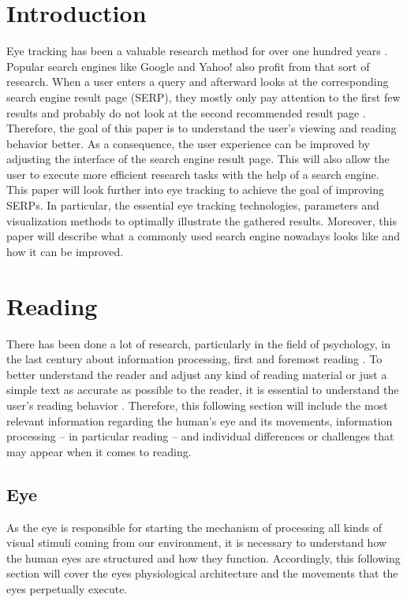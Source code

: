 \section{Introduction}
\label{section:Introduction}
Eye tracking has been a valuable research method for over one hundred years \autocite{biedert2010eyebook}. Popular search engines like Google and Yahoo! also profit from that sort of research. When a user enters a query and afterward looks at the corresponding search engine result page (SERP), they mostly only pay attention to the first few results and probably do not look at the second recommended result page \autocite{lorigo2008eye, liu2015influence}.\\
Therefore, the goal of this paper is to understand the user's viewing and reading behavior better. As a consequence, the user experience can be improved by adjusting the interface of the search engine result page. This will also allow the user to execute more efficient research tasks with the help of a search engine.\\
This paper will look further into eye tracking to achieve the goal of improving SERPs. In particular, the essential eye tracking technologies, parameters and visualization methods to optimally illustrate the gathered results. Moreover, this paper will describe what a commonly used search engine nowadays looks like and how it can be improved.


\section{Reading}
\label{section:Reading}
There has been done a lot of research, particularly in the field of psychology, in the last century about information processing, first and foremost reading \autocite{rayner1998eye, biedert2010eyebook}. 
To better understand the reader and adjust any kind of reading material or just a simple text as accurate as possible to the reader, it is essential to understand the user's reading behavior \autocite{biedert2010eyebook}. 
Therefore, this following section will include the most relevant information regarding the human's eye and its movements, information processing -- in particular reading -- and individual differences or challenges that may appear when it comes to reading.

\subsection{Eye}
\label{subsection:Eye}
As the eye is responsible for starting the mechanism of processing all kinds of visual stimuli coming from our environment, it is necessary to understand how the human eyes are structured and how they function. Accordingly, this following section will cover the eyes physiological architecture and the movements that the eyes perpetually execute.

